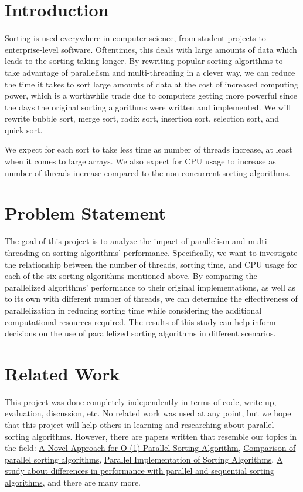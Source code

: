\documentclass[conference]{IEEEtran}
\begin{document}
\section{Introduction}
Sorting is used everywhere in computer science, from student projects to enterprise-level software. Oftentimes, this deals with large amounts of data which leads to the sorting taking longer. By rewriting popular sorting algorithms to take advantage of parallelism and multi-threading in a clever way, we can reduce the time it takes to sort large amounts of data at the cost of increased computing power, which is a worthwhile trade due to computers getting more powerful since the days the original sorting algorithms were written and implemented. We will rewrite bubble sort, merge sort, radix sort, insertion sort, selection sort, and quick sort. 

We expect for each sort to take less time as number of threads increase, at least when it comes to large arrays. We also expect for CPU usage to increase as number of threads increase compared to the non-concurrent sorting algorithms.

\section{Problem Statement}
The goal of this project is to analyze the impact of parallelism and multi-threading on sorting algorithms' performance. Specifically, we want to investigate the relationship between the number of threads, sorting time, and CPU usage for each of the six sorting algorithms mentioned above. By comparing the parallelized algorithms' performance to their original implementations, as well as to its own with different number of threads, we can determine the effectiveness of parallelization in reducing sorting time while considering the additional computational resources required. The results of this study can help inform decisions on the use of parallelized sorting algorithms in different scenarios.

\section{Related Work}
This project was done completely independently in terms of code, write-up, evaluation, discussion, etc. No related work was used at any point, but we hope that this project will help others in learning and researching about parallel sorting algorithms.
However, there are papers written that resemble our topics in the field: \href{https://core.ac.uk/download/pdf/235196192.pdf}{A Novel Approach for O (1) Parallel Sorting Algorithm}, \href{https://arxiv.org/ftp/arxiv/papers/1511/1511.03404.pdf}{Comparison of parallel sorting algorithms}, \href{https://ijcsi.org/papers/IJCSI-9-4-3-164-169.pdf}{Parallel Implementation of Sorting Algorithms}, \href{https://www.diva-portal.org/smash/get/diva2:1559456/FULLTEXT01.pdf}{A study about differences in performance with parallel and sequential sorting algorithms}, and there are many more.
\end{document}
